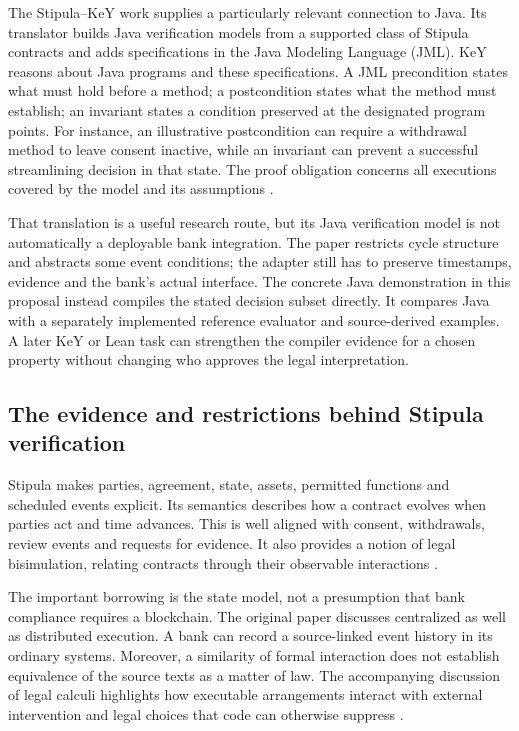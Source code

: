 \documentclass[12pt,a4paper,oneside,openany]{book}
\begin{document}
The Stipula--KeY work supplies a particularly relevant connection to Java.
Its translator builds Java verification models from a supported class of
Stipula contracts and adds specifications in the Java Modeling Language (JML).
KeY reasons about Java programs and these specifications. A JML precondition
states what must hold before a method; a postcondition states what the method
must establish; an invariant states a condition preserved at the designated
program points. For instance, an illustrative postcondition can require a
withdrawal method to leave consent inactive, while an invariant can prevent a
successful streamlining decision in that state. The proof obligation concerns
all executions covered by the model and its assumptions
\citep[secs.~3--5]{stipulakey2025,stipulakeycode}.

That translation is a useful research route, but its Java verification model is
not automatically a deployable bank integration. The paper restricts cycle
structure and abstracts some event conditions; the adapter still has to preserve
timestamps, evidence and the bank's actual interface. The concrete Java
demonstration in this proposal instead compiles the stated decision subset
directly. It compares Java with a separately implemented reference evaluator
and source-derived examples. A later KeY or Lean task can strengthen the
compiler evidence for a chosen property without changing who approves the
legal interpretation.

\subsection{The evidence and restrictions behind Stipula verification}
\label{merge:P-02-literature:05}


Stipula makes parties, agreement, state, assets, permitted functions and scheduled
events explicit. Its semantics describes how a contract evolves when parties act
and time advances. This is well aligned with consent, withdrawals, review events
and requests for evidence. It also provides a notion of legal bisimulation,
relating contracts through their observable interactions
\citep[secs.~3--5]{stipula2021}.

The important borrowing is the state model, not a presumption that bank compliance
requires a blockchain. The original paper discusses centralized as well as
distributed execution. A bank can record a source-linked event history in its
ordinary systems. Moreover, a similarity of formal interaction does not establish
equivalence of the source texts as a matter of law. The accompanying discussion
of legal calculi highlights how executable arrangements interact with external
intervention and legal choices that code can otherwise suppress
\citep{stipula2021,crafa2022}.
\end{document}
